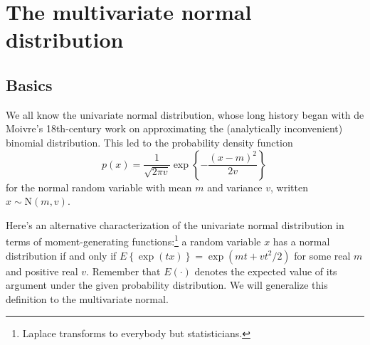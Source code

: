 \documentclass[11pt]{article}
\newcommand{\N}{\mbox{N}}
\begin{document}
\section{The multivariate normal distribution}

\subsection{Basics}

We all know the univariate normal distribution, whose long history began with de Moivre's 18th-century work on approximating the (analytically inconvenient) binomial distribution.  This led to the probability density function
$$
p(x) = \frac{1}{\sqrt{2 \pi v}} \exp \left\{ - \frac{(x-m)^2}{2 v} \right\} \, 
$$
for the normal random variable with mean $m$ and variance $v$, written $x \sim \N(m, v)$.

Here's an alternative characterization of the univariate normal distribution in terms of moment-generating functions:\footnote{Laplace transforms to everybody but statisticians.} a random variable $x$ has a normal distribution if and only if $E \left\{ \exp(tx) \right\} = \exp(mt + v t^2 /2)$ for some real $m$ and positive real $v$.  Remember that $E(\cdot)$ denotes the expected value of its argument under the given probability distribution.  We will generalize this definition to the multivariate normal.
\end{document}
